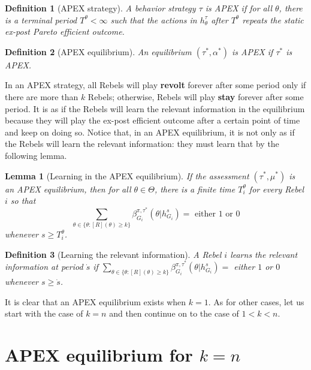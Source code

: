 \documentclass[12pt,letter]{article}
\newtheorem{lemma}{Lemma}[section]
\newtheorem{definition}{Definition}[section]
\theoremstyle{definition}
\theoremstyle{remark}
\theoremstyle{claim}
\begin{document}
\begin{definition}[APEX strategy]
A behavior strategy $\tau$ is APEX  if for all $\theta$, there is a terminal period $T^{\theta}<\infty$ such that the actions in $h^{\tau}_{\theta}$ after $T^{\theta}$ repeats the static ex-post Pareto efficient outcome.
\end{definition}

\begin{definition}[APEX equilibrium]\label{Def_ex-post_efficient}
An equilibrium $(\tau^{*},\alpha^{*})$ is APEX if $\tau^{*}$ is APEX.
\end{definition}




In an APEX strategy, all Rebels will play \textbf{revolt} forever after some period only if there are more than $k$ Rebels; otherwise, Rebels will play \textbf{stay} forever after some period. It is as if the Rebels will learn the relevant information in the equilibrium because they will play the ex-post efficient outcome after a certain point of time and keep on doing so. Notice that, in an APEX equilibrium, it is not only as if the Rebels will learn the relevant information: they must learn that by the following lemma. 

\begin{lemma}[Learning in the APEX equilibrium]\label{lemma_learn}
If the assessment $(\tau^*,\mu^{*})$ is an APEX equilibrium, then for all $\theta\in \Theta$, there is a finite time $T^{\theta}_i$ for every Rebel $i$ so that
\[\sum_{\theta\in\{\theta:[R](\theta)\geq k\}}\beta^{\pi,\tau^*}_{G_i}(\theta|h^{s}_{G_i})= \text{ either } 1 \text{ or } 0\]
whenever $s\geq T^{\theta}_i$.
\end{lemma}



\begin{definition}[Learning the relevant information]\label{def_learn}
A Rebel $i$ learns the relevant information at period $\dot{s}$ if $\sum_{\theta\in\{\theta:[R](\theta)\geq k\}}\beta^{\pi,\tau^*}_{G_i}(\theta|h^{s}_{G_i})=$ either $1$ or $0$ whenever $s\geq \dot{s}$.
\end{definition}

It is clear that an APEX equilibrium exists when $k=1$. As for other cases, let us start with the case of $k=n$ and then continue on to the case of $1<k<n$.

\section{APEX equilibrium for $k=n$}
\label{sec:equilibrium_1}
\end{document}
